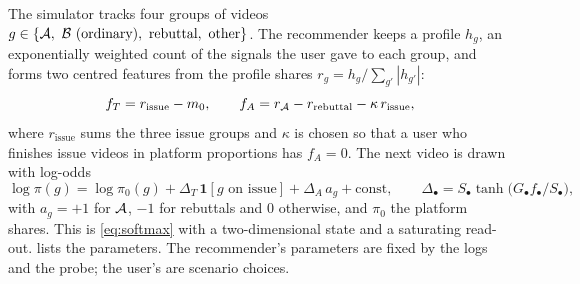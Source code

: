 The simulator tracks four groups of videos $g\in\{\A,\ \B\text{ (ordinary)},\ \text{rebuttal},\ \text{other}\}$. The recommender keeps a profile $h_g$, an exponentially weighted count of the signals the user gave to each group, and forms two centred features from the profile shares $r_g=h_g/\sum_{g'}|h_{g'}|$:
\[
  f_T=r_{\text{issue}}-m_0,\qquad f_A=r_{\mathcal{A}}-r_{\text{rebuttal}}-\kappa\,r_{\text{issue}},
\]
where $r_{\text{issue}}$ sums the three issue groups and $\kappa$ is chosen so that a user who finishes issue videos in platform proportions has $f_A=0$. The next video is drawn with log-odds
\[
  \log\pi(g)=\log\pi_0(g)+\Delta_T\,\mathbf{1}[g\text{ on issue}]+\Delta_A\,a_g+\text{const},\qquad
  \Delta_\bullet=S_\bullet\tanh\!\bigl(G_\bullet f_\bullet/S_\bullet\bigr),
\]
with $a_g=+1$ for $\mathcal{A}$, $-1$ for rebuttals and $0$ otherwise, and $\pi_0$ the platform shares. This is \cref{eq:softmax} with a two-dimensional state and a saturating read-out.  lists the parameters. The recommender's parameters are fixed by the logs and the probe; the user's are scenario choices.

